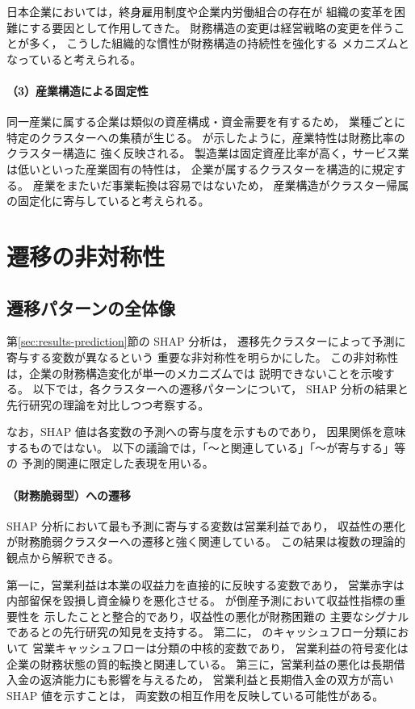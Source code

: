 日本企業においては，終身雇用制度や企業内労働組合の存在が
組織の変革を困難にする要因として作用してきた。
財務構造の変更は経営戦略の変更を伴うことが多く，
こうした組織的な慣性が財務構造の持続性を強化する
メカニズムとなっていると考えられる。

\paragraph{（3）産業構造による固定性}
同一産業に属する企業は類似の資産構成・資金需要を有するため，
業種ごとに特定のクラスターへの集積が生じる。
 が示したように，産業特性は財務比率のクラスター構造に
強く反映される。
製造業は固定資産比率が高く，サービス業は低いといった産業固有の特性は，
企業が属するクラスターを構造的に規定する。
産業をまたいだ事業転換は容易ではないため，
産業構造がクラスター帰属の固定化に寄与していると考えられる。

\section{遷移の非対称性}
\label{sec:disc-asymmetry}

\subsection{遷移パターンの全体像}

第\ref{sec:results-prediction}節の SHAP 分析は，
遷移先クラスターによって予測に寄与する変数が異なるという
重要な非対称性を明らかにした。
この非対称性は，企業の財務構造変化が単一のメカニズムでは
説明できないことを示唆する。
以下では，各クラスターへの遷移パターンについて，
SHAP 分析の結果と先行研究の理論を対比しつつ考察する。

なお，SHAP 値は各変数の予測への寄与度を示すものであり，
因果関係を意味するものではない。
以下の議論では，「〜と関連している」「〜が寄与する」等の
予測的関連に限定した表現を用いる。

\paragraph{（財務脆弱型）への遷移}
SHAP 分析において最も予測に寄与する変数は営業利益であり，
収益性の悪化が財務脆弱クラスターへの遷移と強く関連している。
この結果は複数の理論的観点から解釈できる。

第一に，営業利益は本業の収益力を直接的に反映する変数であり，
営業赤字は内部留保を毀損し資金繰りを悪化させる。
 が倒産予測において収益性指標の重要性を
示したことと整合的であり，収益性の悪化が財務困難の
主要なシグナルであるとの先行研究の知見を支持する。
第二に， のキャッシュフロー分類において
営業キャッシュフローは分類の中核的変数であり，
営業利益の符号変化は企業の財務状態の質的転換と関連している。
第三に，営業利益の悪化は長期借入金の返済能力にも影響を与えるため，
営業利益と長期借入金の双方が高い SHAP 値を示すことは，
両変数の相互作用を反映している可能性がある。

